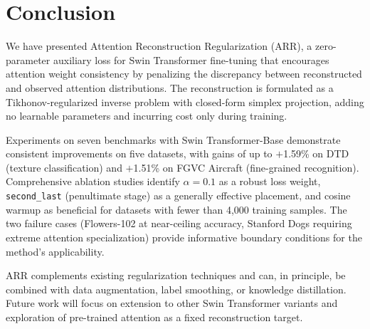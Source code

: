 \documentclass[review,12pt,authoryear]{elsarticle}
\newcommand{\method}{ARR}
\begin{document}
\section{Conclusion}
\label{sec:conclusion}

We have presented Attention Reconstruction Regularization (\method{}), a zero-parameter auxiliary loss for Swin Transformer fine-tuning that encourages attention weight consistency by penalizing the discrepancy between reconstructed and observed attention distributions.
The reconstruction is formulated as a Tikhonov-regularized inverse problem with closed-form simplex projection, adding no learnable parameters and incurring cost only during training.

Experiments on seven benchmarks with Swin Transformer-Base demonstrate consistent improvements on five datasets, with gains of up to $+$1.59\% on DTD (texture classification) and $+$1.51\% on FGVC Aircraft (fine-grained recognition).
Comprehensive ablation studies identify $\alpha = 0.1$ as a robust loss weight, \texttt{second\_last} (penultimate stage) as a generally effective placement, and cosine warmup as beneficial for datasets with fewer than 4{,}000 training samples.
The two failure cases (Flowers-102 at near-ceiling accuracy, Stanford Dogs requiring extreme attention specialization) provide informative boundary conditions for the method's applicability.

\method{} complements existing regularization techniques and can, in principle, be combined with data augmentation, label smoothing, or knowledge distillation.
Future work will focus on extension to other Swin Transformer variants and exploration of pre-trained attention as a fixed reconstruction target.
\end{document}

